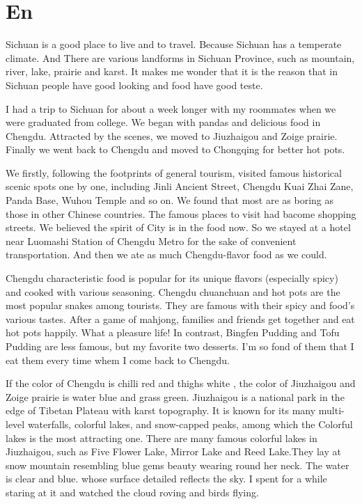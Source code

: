 \documentclass[UTF8]{article}
\begin{document}
\section{En}

Sichuan is a good place to live and to travel. Because Sichuan has a temperate climate.
And There are various landforms in Sichuan Province, such as mountain,  river, lake, prairie and karst.
It makes me wonder that it is the reason that in Sichuan people have good looking and food have good teste.

I had a trip to Sichuan for about a week longer with my roommates when we were graduated from college.
We began with pandas and delicious food in Chengdu. Attracted by the scenes, we moved to  Jiuzhaigou and Zoige prairie. Finally we went back to Chengdu and moved to Chongqing for better hot pots.

We firstly, following the footprints of general tourism, visited famous historical scenic spots one by one, including Jinli Ancient Street, Chengdu Kuai Zhai Zane, Panda Base, Wuhou Temple and so on. We found that most are as boring as those in other Chinese countries. The famous places to visit had bacome shopping streets. We believed the spirit of City is in the food now. So we stayed at a hotel near Luomashi Station of Chengdu Metro for the sake of convenient transportation. And then we ate as much Chengdu-flavor food as we could.

Chengdu characteristic food is popular for its unique flavors (especially spicy) and cooked with various seasoning. Chengdu chuanchuan and hot pots are the most popular snakes among tourists. They are famous with their spicy and food's various tastes. After a game of mahjong, families and friends get together and eat hot pots happily. What a pleasure life! In contrast, Bingfen Pudding and Tofu Pudding are less famous, but my favorite two desserts. I'm so fond of them that I eat them every time whem I come back to Chengdu. 

If the color of Chengdu is chilli red and thighs white , the color of Jiuzhaigou and Zoige prairie is water blue and grass green.
Jiuzhaigou is a national park in the edge of Tibetan Plateau with karst topography. It is known for its many multi-level waterfalls, colorful lakes, and snow-capped peaks, among which the Colorful lakes is  the most attracting one. There are many famous colorful lakes in Jiuzhaigou, such as  Five Flower Lake, Mirror Lake and Reed Lake.They lay at snow mountain resembling  blue gems beauty wearing round her neck. The water is clear and blue. whose surface detailed reflects the sky. I spent for a while staring at it and watched the cloud roving and birds flying. 
\end{document}
